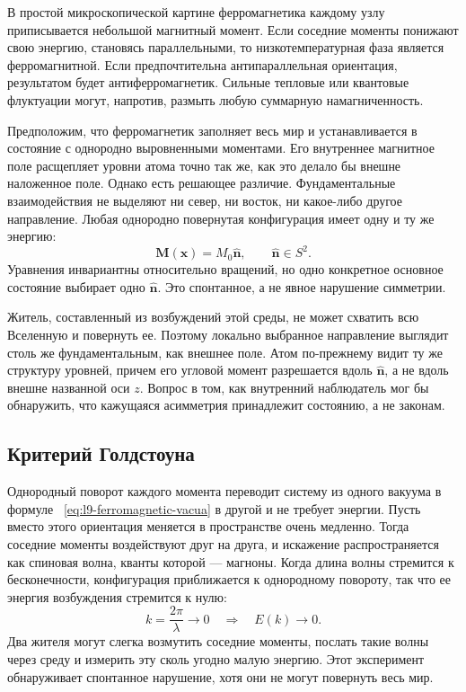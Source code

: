 В простой микроскопической картине ферромагнетика каждому узлу приписывается небольшой магнитный момент. Если соседние моменты понижают свою энергию, становясь параллельными, то низкотемпературная фаза является ферромагнитной. Если предпочтительна антипараллельная ориентация, результатом будет антиферромагнетик. Сильные тепловые или квантовые флуктуации могут, напротив, размыть любую суммарную намагниченность.

Предположим, что ферромагнетик заполняет весь мир и устанавливается в состояние с однородно выровненными моментами. Его внутреннее магнитное поле расщепляет уровни атома точно так же, как это делало бы внешне наложенное поле. Однако есть решающее различие. Фундаментальные взаимодействия не выделяют ни север, ни восток, ни какое-либо другое направление. Любая однородно повернутая конфигурация имеет одну и ту же энергию:
\begin{equation}
\mathbf M(\mathbf x)=M_0\hat{\mathbf n},
\qquad
\hat{\mathbf n}\in S^2.
\label{eq:l9-ferromagnetic-vacua}
\end{equation}
Уравнения инвариантны относительно вращений, но одно конкретное основное состояние выбирает одно \(\hat{\mathbf n}\). Это спонтанное, а не явное нарушение симметрии.

Житель, составленный из возбуждений этой среды, не может схватить всю Вселенную и повернуть ее. Поэтому локально выбранное направление выглядит столь же фундаментальным, как внешнее поле. Атом по-прежнему видит ту же структуру уровней, причем его угловой момент разрешается вдоль \(\hat{\mathbf n}\), а не вдоль внешне названной оси \(z\). Вопрос в том, как внутренний наблюдатель мог бы обнаружить, что кажущаяся асимметрия принадлежит состоянию, а не законам.

\subsection{Критерий Голдстоуна}

Однородный поворот каждого момента переводит систему из одного вакуума в формуле ~\eqref{eq:l9-ferromagnetic-vacua} в другой и не требует энергии. Пусть вместо этого ориентация меняется в пространстве очень медленно. Тогда соседние моменты воздействуют друг на друга, и искажение распространяется как спиновая волна, кванты которой — магноны. Когда длина волны стремится к бесконечности, конфигурация приближается к однородному повороту, так что ее энергия возбуждения стремится к нулю:
\begin{equation}
k=\frac{2\pi}{\lambda}\longrightarrow0
\quad\Longrightarrow\quad
E(k)\longrightarrow0.
\label{eq:l9-gapless-magnon}
\end{equation}
Два жителя могут слегка возмутить соседние моменты, послать такие волны через среду и измерить эту сколь угодно малую энергию. Этот эксперимент обнаруживает спонтанное нарушение, хотя они не могут повернуть весь мир.

